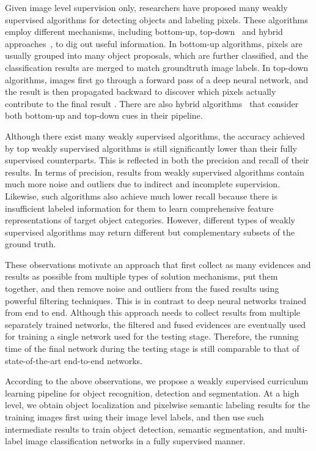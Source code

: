 \documentclass[10pt,twocolumn,letterpaper]{article}
\begin{document}
Given image level supervision only, researchers have proposed many weakly supervised algorithms for detecting objects and labeling pixels. These algorithms employ different mechanisms, including bottom-up, top-down~\cite{zhang2016top,lapuschkin2016analyzing} and hybrid approaches~\cite{roy2017combining}, to dig out useful information.
In bottom-up algorithms, pixels are usually grouped into many object proposals,
which are further classified, and the classification results are merged to match groundtruth image labels.
In top-down algorithms, images first go through a forward pass of a deep neural network, and the result is then propagated backward to discover which pixels actually contribute to the final result \cite{zhang2016top,lapuschkin2016analyzing}. There are also hybrid algorithms~\cite{roy2017combining} that consider both bottom-up and top-down cues in their pipeline.


Although there exist many weakly supervised algorithms, the accuracy achieved by top weakly supervised algorithms is still significantly lower than their fully supervised counterparts. This is reflected in both the precision and recall of their results. In terms of precision, results from weakly supervised algorithms contain much more noise and outliers due to indirect and incomplete supervision. Likewise, such algorithms also achieve much lower recall because there is insufficient labeled information for them to learn comprehensive feature representations of target object categories. However, different types of weakly supervised algorithms may return different but complementary subsets of the ground truth.

These observations motivate an approach that first collect as many evidences and results as possible from multiple types of solution mechanisms, put them together, and then remove noise and outliers from the fused results using powerful filtering techniques. This is in contrast to deep neural networks trained from end to end. Although this approach needs to collect results from multiple separately trained networks, the filtered and fused evidences are eventually used for training a single network used for the testing stage. Therefore, the running time of the final network during the testing stage is still comparable to that of state-of-the-art end-to-end networks.



According to the above observations, we propose a weakly supervised curriculum learning pipeline for object recognition, detection and segmentation. At a high level, we obtain object localization and pixelwise semantic labeling results for the training images first using their image level labels, and then use such intermediate results to train object detection, semantic segmentation, and multi-label image classification networks in a fully supervised manner.
\end{document}

